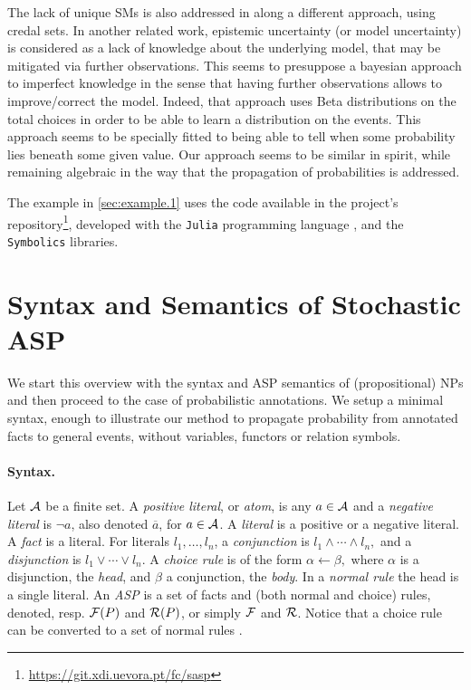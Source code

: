 \documentclass[a4paper]{article}
\renewcommand{\cite}{\citep}
\newcommand{\at}[1]{\ensuremath{\!\del{#1}}}        %
\newcommand{\cla}[1]{\ensuremath{{\cal #1}}}        %
\newcommand{\conj}{\ensuremath{\wedge}} \newcommand{\disj}{\ensuremath{\vee}}
\newcommand{\clause}{\ensuremath{\leftarrow}}
\newcommand{\co}[1]{\ensuremath{\overline{#1}}}     %
\newcommand{\ATOMSset}{\ensuremath{\cla{A}}}
\newcommand{\FACTSset}{\ensuremath{\cla{F}}}
\newcommand{\RULESset}{\ensuremath{\cla{R}}}
\begin{document}
The lack of unique \acp{SM} is also addressed in \cite{cozman2020joy}
along a different approach, using credal sets.
%
In another related work, \cite{verreet2022inference} epistemic
uncertainty (or model uncertainty) is considered as a lack of
knowledge about the underlying model, that may be mitigated via
further observations.  This seems to presuppose a bayesian approach to
imperfect knowledge in the sense that having further observations
allows to improve/correct the model.  Indeed, that approach uses Beta
distributions on the total choices in order to be able to learn a
distribution on the events.
%
This approach seems to be specially fitted to being able to tell when
some probability lies beneath some given value.  Our approach seems to
be similar in spirit, while remaining algebraic in the way that the
propagation of probabilities is addressed.

The example in \cref{sec:example.1} uses the code available in the
project's
repository\footnote{\url{https://git.xdi.uevora.pt/fc/sasp}},
developed with the \texttt{Julia} programming language
\cite{bezanson2017julia}, and the \texttt{Symbolics}
\cite{gowda2021high} libraries.


\section{Syntax and Semantics of Stochastic ASP}
\label{sec:syntax.and.semantics}

We start this overview with the syntax and \ac{ASP} semantics of
(propositional) \aclp{NP} and then proceed to the case of
probabilistic annotations.  We setup a minimal syntax, enough to
illustrate our method to propagate probability from annotated facts to
general events, without variables, functors or relation symbols.


\paragraph{Syntax.}

Let \(\ATOMSset\) be a finite set.
A \textit{positive literal}, or \textit{atom},
is any \(a \in \ATOMSset\)
and a \textit{negative literal} is \(\neg a\), also denoted \(\co{a}\),
for \(a\in\ATOMSset\).
A \textit{literal} is a positive or a negative literal.
A \textit{fact} is a literal.
For literals $l_1, \ldots, l_n$, a \emph{conjunction} is
  \( l _1 \conj \cdots \conj l_n, \)
and a \textit{disjunction} is
  \( l_1 \disj \cdots \disj l_n. \)
A \textit{choice rule} is of the form
   \( \alpha \clause \beta, \)
where $\alpha$ is a disjunction, the \textit{head},
and \(\beta\) a conjunction, the \textit{body}.
In a \textit{normal rule} the head is a single literal.
An \textit{\acf{ASP}} is a set of facts and
(both normal and choice) rules, denoted, resp. $\FACTSset\at{P}$ and
$\RULESset\at{P}$, or simply $\FACTSset$ and $\RULESset$.
Notice that a choice rule can be converted to a set of normal rules
\cite{gebser2022answer}.
\end{document}
